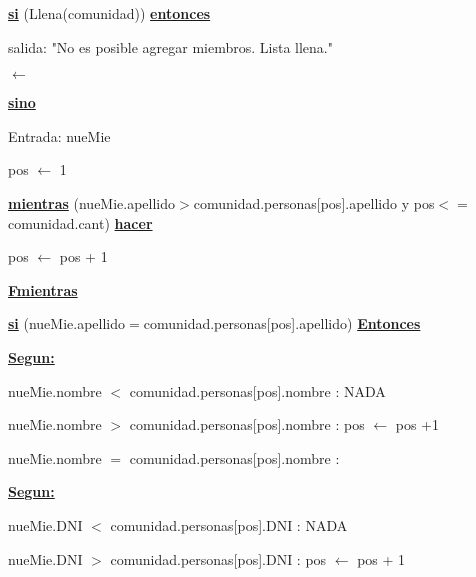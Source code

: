 \documentclass{article}
\begin{document}
            \hspace{12mm}\underline{\textbf{si}} (Llena(comunidad)) \underline{\textbf{entonces}}

                \hspace{16mm}salida: "No es posible agregar miembros. Lista llena."

                \hspace{16mm}$\leftarrow$

            \hspace{12mm}\underline{\textbf{sino}}

            \hspace{16mm}Entrada: nueMie

            \hspace{16mm}pos $\leftarrow$ 1

            \hspace{16mm}\underline{\textbf{mientras}} (nueMie.apellido$>$comunidad.personas[pos].apellido
            y pos$<=$comunidad.cant) \underline{\textbf{hacer}}

                \hspace{20mm}pos $\leftarrow$ pos + 1

            \hspace{16mm}\underline{\textbf{Fmientras}}

            \hspace{16mm}\underline{\textbf{si}} (nueMie.apellido$=$comunidad.personas[pos].apellido) \underline{\textbf{Entonces}}

                \hspace{20mm}\underline{\textbf{Segun:}} 

                    \hspace{24mm} nueMie.nombre $<$ comunidad.personas[pos].nombre : NADA

                    \hspace{24mm} nueMie.nombre $>$ comunidad.personas[pos].nombre : pos $\leftarrow$ pos +1

                    \hspace{24mm} nueMie.nombre $=$ comunidad.personas[pos].nombre :

                        \hspace{28mm} \underline{\textbf{Segun:}}

                            \hspace{32mm} nueMie.DNI $<$ comunidad.personas[pos].DNI : NADA

                            \hspace{32mm} nueMie.DNI $>$ comunidad.personas[pos].DNI : pos $\leftarrow$ pos + 1
\end{document}
